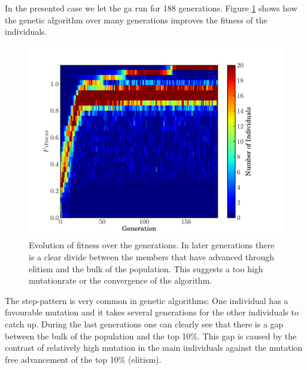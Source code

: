In the presented case we let the \gls{ga} run for 188 generations. Figure \ref{fig:fitness_evolution} shows how the genetic algorithm over many generations improves the fitness of the \glspl{individual}. 

\begin{figure}[t!] %
   \centering
   \includegraphics[width=\textwidth, trim=0 0 2cm 0, clip]{chapter_dalek/plots/plot_02bo_fit_evol.pdf} 
     \caption[Evolution of fitness over the generations]{Evolution of fitness over the generations. In later generations there is a clear divide between the members that have advanced through elitism and the bulk of the population. This suggests a too high mutationrate or the convergence of the algorithm. }
   \label{fig:fitness_evolution}
\end{figure}

The step-pattern is very common in genetic algorithms: One individual has a favourable mutation and it takes several generations for the other \glspl{individual} to catch up. During the last generations one can clearly see that there is a gap between the bulk of the population and the top 10\%. This gap is caused by the contrast of relatively high mutation in the main individuals against the mutation free advancement of the top 10\% (\gls{elitism}).


